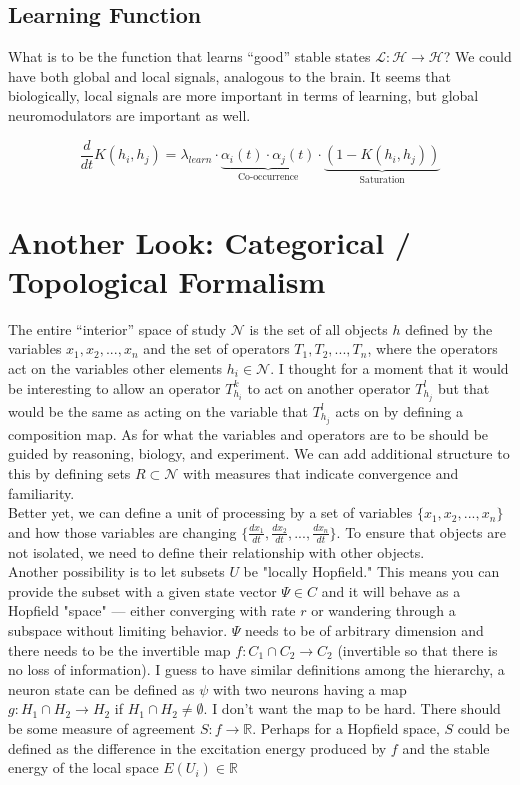 \documentclass{article}
\begin{document}
\subsection{Learning Function}
What is to be the function that learns ``good'' stable states $\mathcal{L} : \mathcal{H} \to \mathcal{H} $? We could have both global and local signals, analogous to the brain. It seems that biologically, local signals are more important in terms of learning, but global neuromodulators are important as well.

\begin{equation} 
\frac{d}{dt} K(h_i, h_j) = \lambda_{learn} \cdot \underbrace{\alpha_i(t) \cdot \alpha_j(t)}_{\text{Co-occurrence}} \cdot \underbrace{(1 - K(h_i, h_j))}_{\text{Saturation}} 
\end{equation}



\section{Another Look: Categorical / Topological Formalism}
The entire ``interior'' space of study $\mathcal{N}$ is the set of all objects $h$ defined by the variables $x_1, x_2,...,x_n$ and the set of operators $T_1, T_2,...,T_n$, where the operators act on the variables other elements $h_i \in \mathcal{N}$. I thought for a moment that it would be interesting to allow an operator $T_{h_i}^k$ to act on another operator $T_{h_j}^l$ but that would be the same as acting on the variable that $T_{h_j}^l$ acts on by defining a composition map. As for what the variables and operators are to be should be guided by reasoning, biology, and experiment. We can add additional structure to this by defining sets $R \subset \mathcal{N}$ with measures that indicate convergence and familiarity. \\

Better yet, we can define a unit of processing by a set of variables $\{ x_1, x_2, ...,x_n \}$ and how those variables are changing $\{ \frac{dx_1}{dt}, \frac{dx_2}{dt}, ...,  \frac{dx_n}{dt} \}$. To ensure that objects are not isolated, we need to define their relationship with other objects. \\

Another possibility is to let subsets $U$ be "locally Hopfield." This means you can provide the subset with a given state vector $\Psi \in C$ and it will behave as a Hopfield "space"  --- either converging with rate $r$ or wandering through a subspace without limiting behavior. $\Psi$ needs to be of arbitrary dimension and there needs to be the invertible map $f: C_1 \cap C_2 \to C_2$ (invertible so that there is no loss of information). I guess to have similar definitions among the hierarchy, a neuron state can be defined as $\psi$ with two neurons having a map $g: H_1 \cap H_2 \to H_2$ if $H_1 \cap H_2 \ne \emptyset$. I don't want the map to be hard. There should be some measure of agreement $S: f \to \mathbb{R}$. Perhaps for a Hopfield space, $S$ could be defined as the difference in the excitation energy produced by $f$ and the stable energy of the local space $E(U_i) \in \mathbb{R}$ \\
\end{document}
